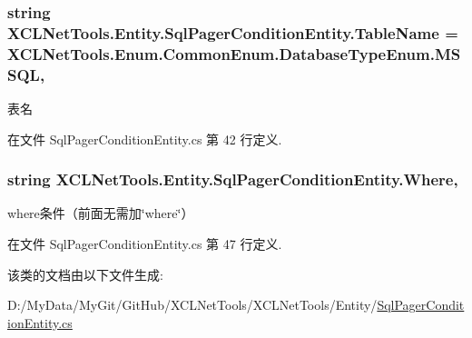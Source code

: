 \hypertarget{class_x_c_l_net_tools_1_1_entity_1_1_sql_pager_condition_entity_ac4a6c5b0eeef5c0ce63cd3aa15c91e15}{
\subsubsection[{Table\-Name}]{\setlength{\rightskip}{0pt plus 5cm}string X\-C\-L\-Net\-Tools.\-Entity.\-Sql\-Pager\-Condition\-Entity.\-Table\-Name = X\-C\-L\-Net\-Tools.\-Enum.\-Common\-Enum.\-Database\-Type\-Enum.\-M\-S\-S\-Q\-L\hspace{0.3cm}{\ttfamily [get]}, {\ttfamily [set]}}}\label{class_x_c_l_net_tools_1_1_entity_1_1_sql_pager_condition_entity_ac4a6c5b0eeef5c0ce63cd3aa15c91e15}


表名 



在文件 Sql\-Pager\-Condition\-Entity.\-cs 第 42 行定义.

\hypertarget{class_x_c_l_net_tools_1_1_entity_1_1_sql_pager_condition_entity_a0201ec19db112ae1787225c4e03a9b43}{
\subsubsection[{Where}]{\setlength{\rightskip}{0pt plus 5cm}string X\-C\-L\-Net\-Tools.\-Entity.\-Sql\-Pager\-Condition\-Entity.\-Where\hspace{0.3cm}{\ttfamily [get]}, {\ttfamily [set]}}}\label{class_x_c_l_net_tools_1_1_entity_1_1_sql_pager_condition_entity_a0201ec19db112ae1787225c4e03a9b43}


where条件（前面无需加\char`\"{}where\char`\"{}） 



在文件 Sql\-Pager\-Condition\-Entity.\-cs 第 47 行定义.



该类的文档由以下文件生成\-:\begin{DoxyCompactItemize}
\item 
D\-:/\-My\-Data/\-My\-Git/\-Git\-Hub/\-X\-C\-L\-Net\-Tools/\-X\-C\-L\-Net\-Tools/\-Entity/\hyperlink{_sql_pager_condition_entity_8cs}{Sql\-Pager\-Condition\-Entity.\-cs}\end{DoxyCompactItemize}
